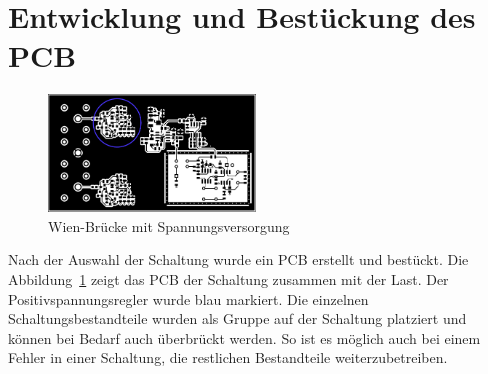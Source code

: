 \section{Entwicklung und Bestückung des PCB}
\begin{figure}
  \centering
  \includegraphics[clip, width=0.49\textwidth]{./../common/bilder/pcb-wien.pdf}
  \caption{Wien-Brücke mit Spannungsversorgung}\label{FIG:PCB}
\end{figure}
Nach der Auswahl der Schaltung wurde ein PCB erstellt und bestückt.
Die Abbildung~\ref{FIG:PCB} zeigt das PCB der Schaltung zusammen mit der Last.
Der Positivspannungsregler wurde blau markiert.
Die einzelnen Schaltungsbestandteile wurden als Gruppe auf der Schaltung 
platziert und können bei Bedarf auch überbrückt werden. So ist es möglich auch
bei einem Fehler in einer Schaltung, die restlichen Bestandteile 
weiterzubetreiben. 
